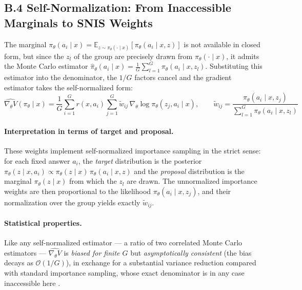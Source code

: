 \documentclass[11pt,a4paper]{article}
\begin{document}
\subsection*{B.4 Self-Normalization: From Inaccessible Marginals to SNIS Weights}
The marginal $\pi_\theta(a_i \mid x) = \mathbb{E}_{z \sim \pi_\theta(\cdot \mid x)}[\pi_\theta(a_i \mid x, z)]$ is not available in closed form, but since the $z_l$ of the group are precisely drawn from $\pi_\theta(\cdot \mid x)$, it admits the Monte Carlo estimator $\hat{\pi}_\theta(a_i \mid x) = \frac{1}{G} \sum_{l=1}^G \pi_\theta(a_i \mid x, z_l)$. Substituting this estimator into the denominator, the $1/G$ factors cancel and the gradient estimator takes the self-normalized form:
\begin{equation}
\widehat{\nabla_\theta V}(\pi_\theta \mid x) = \frac{1}{G} \sum_{i=1}^G r(x, a_i) \sum_{j=1}^G \tilde{w}_{ij} \, \nabla_\theta \log \pi_\theta(z_j, a_i \mid x),
\qquad
\tilde{w}_{ij} = \frac{\pi_\theta(a_i \mid x, z_j)}{\sum_{l=1}^G \pi_\theta(a_i \mid x, z_l)}
\end{equation}

\paragraph{Interpretation in terms of target and proposal.} These weights implement self-normalized importance sampling in the strict sense: for each fixed answer $a_i$, the \emph{target} distribution is the posterior $\pi_\theta(z \mid x, a_i) \propto \pi_\theta(z \mid x)\, \pi_\theta(a_i \mid x, z)$ and the \emph{proposal} distribution is the marginal $\pi_\theta(z \mid x)$ from which the $z_l$ are drawn. The unnormalized importance weights are then proportional to the likelihood $\pi_\theta(a_i \mid x, z_j)$, and their normalization over the group yields exactly $\tilde{w}_{ij}$.

\paragraph{Statistical properties.} Like any self-normalized estimator — a ratio of two correlated Monte Carlo estimators — $\widehat{\nabla_\theta V}$ is \emph{biased for finite $G$} but \emph{asymptotically consistent} (the bias decays as $\mathcal{O}(1/G)$), in exchange for a substantial variance reduction compared with standard importance sampling, whose exact denominator is in any case inaccessible here \cite[chap.~9]{owen2013montecarlo}.
\end{document}
